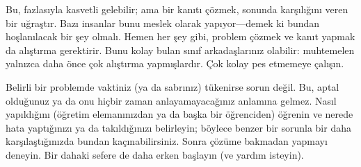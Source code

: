 Bu, fazlasıyla kasvetli gelebilir; ama bir kanıtı çözmek, sonunda
karşılığını veren bir uğraştır. Bazı insanlar bunu meslek olarak
yapıyor---demek ki bundan hoşlanılacak bir şey olmalı. Hemen her şey
gibi, problem çözmek ve kanıt yapmak da alıştırma gerektirir. Bunu kolay
bulan sınıf arkadaşlarınız olabilir: muhtemelen yalnızca daha önce çok
alıştırma yapmışlardır. Çok kolay pes etmemeye çalışın.

Belirli bir problemde vaktiniz (ya da sabrınız) tükenirse sorun değil.
Bu, aptal olduğunuz ya da onu hiçbir zaman anlayamayacağınız anlamına
gelmez. Nasıl yapıldığını (öğretim elemanınızdan ya da başka bir
öğrenciden) öğrenin ve nerede hata yaptığınızı ya da takıldığınızı
belirleyin; böylece benzer bir sorunla bir daha karşılaştığınızda bundan
kaçınabilirsiniz. Sonra çözüme bakmadan yapmayı deneyin. Bir dahaki
sefere de daha erken başlayın (ve yardım isteyin).

